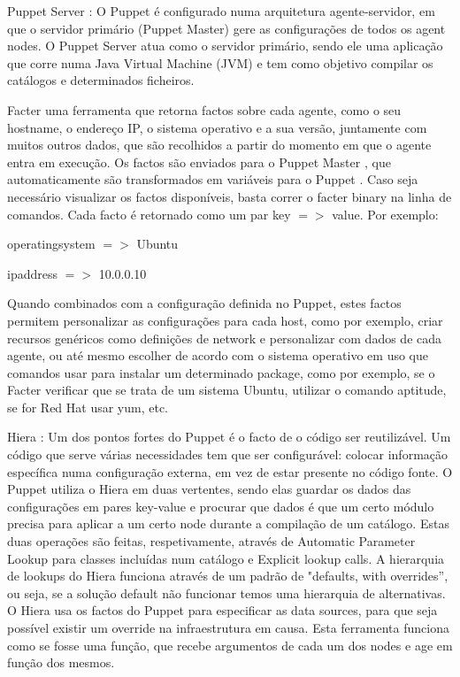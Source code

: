 \documentclass{article}
\begin{document}
Puppet Server \cite{puppet-master}: O Puppet \cite{puppet} é configurado numa arquitetura agente-servidor, em que o servidor primário (Puppet Master) gere as configurações de todos os agent nodes. O Puppet Server atua como o servidor primário, sendo ele uma aplicação que corre numa Java Virtual Machine (JVM) e tem como objetivo compilar os catálogos \cite{catalog} e determinados ficheiros.

Facter \cite{facter} uma ferramenta que retorna factos sobre cada agente, como o seu hostname, o endereço IP, o sistema operativo e a sua versão, juntamente com muitos outros dados, que são recolhidos a partir do momento em que o agente entra em execução. Os factos são enviados para o Puppet Master \cite{puppet-master}, que automaticamente são transformados em variáveis para o Puppet \cite{puppet}.
Caso seja necessário visualizar os factos disponíveis, basta correr o facter binary na linha de comandos. Cada facto é retornado como um par key $=>$ value. Por exemplo:

operatingsystem $=>$ Ubuntu

ipaddress $=>$ 10.0.0.10

Quando combinados com a configuração definida no Puppet, estes factos permitem personalizar as configurações para cada host, como por exemplo, criar recursos genéricos como definições de network e personalizar com dados de cada agente, ou até mesmo escolher de acordo com o sistema operativo em uso que comandos usar para instalar um determinado package, como por exemplo, se o Facter verificar que se trata de um sistema Ubuntu, utilizar o comando aptitude, se for Red Hat usar yum, etc.

Hiera \cite{hiera}: Um dos pontos fortes do Puppet é o facto de o código ser reutilizável. Um código que serve várias necessidades tem que ser configurável: colocar informação específica numa configuração externa, em vez de estar presente no código fonte.
O Puppet utiliza o Hiera em duas vertentes, sendo elas guardar os dados das configurações em pares key-value e procurar que dados é que um certo módulo precisa para aplicar a um certo node durante a compilação de um catálogo. Estas duas operações são feitas, respetivamente, através de Automatic Parameter Lookup para classes incluídas num catálogo e Explicit lookup calls.
A hierarquia de lookups do Hiera funciona através de um padrão de "defaults, with overrides”, ou seja, se a solução default não funcionar temos uma hierarquia de alternativas. O Hiera usa os factos do Puppet \cite{puppet} para especificar as data sources, para que seja possível existir um override na infraestrutura em causa. Esta ferramenta funciona como se fosse uma função, que recebe argumentos de cada um dos nodes e age em função dos mesmos.
\end{document}
